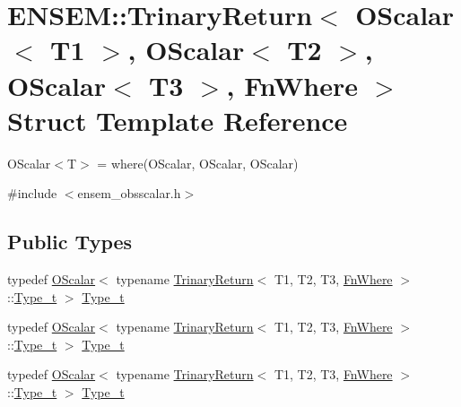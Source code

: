 \hypertarget{structENSEM_1_1TrinaryReturn_3_01OScalar_3_01T1_01_4_00_01OScalar_3_01T2_01_4_00_01OScalar_3_01T3_01_4_00_01FnWhere_01_4}{}\section{E\+N\+S\+EM\+:\+:Trinary\+Return$<$ O\+Scalar$<$ T1 $>$, O\+Scalar$<$ T2 $>$, O\+Scalar$<$ T3 $>$, Fn\+Where $>$ Struct Template Reference}
\label{structENSEM_1_1TrinaryReturn_3_01OScalar_3_01T1_01_4_00_01OScalar_3_01T2_01_4_00_01OScalar_3_01T3_01_4_00_01FnWhere_01_4}


O\+Scalar$<$\+T$>$ = where(\+O\+Scalar, O\+Scalar, O\+Scalar)  




{\ttfamily \#include $<$ensem\+\_\+obsscalar.\+h$>$}

\subsection*{Public Types}
\begin{DoxyCompactItemize}
\item 
typedef \mbox{\hyperlink{classENSEM_1_1OScalar}{O\+Scalar}}$<$ typename \mbox{\hyperlink{structENSEM_1_1TrinaryReturn}{Trinary\+Return}}$<$ T1, T2, T3, \mbox{\hyperlink{structENSEM_1_1FnWhere}{Fn\+Where}} $>$\+::\mbox{\hyperlink{structENSEM_1_1TrinaryReturn_3_01OScalar_3_01T1_01_4_00_01OScalar_3_01T2_01_4_00_01OScalar_3_01T3_01_4_00_01FnWhere_01_4_a6b5cfd8880a0a52baef8bb62d3af1244}{Type\+\_\+t}} $>$ \mbox{\hyperlink{structENSEM_1_1TrinaryReturn_3_01OScalar_3_01T1_01_4_00_01OScalar_3_01T2_01_4_00_01OScalar_3_01T3_01_4_00_01FnWhere_01_4_a6b5cfd8880a0a52baef8bb62d3af1244}{Type\+\_\+t}}
\item 
typedef \mbox{\hyperlink{classENSEM_1_1OScalar}{O\+Scalar}}$<$ typename \mbox{\hyperlink{structENSEM_1_1TrinaryReturn}{Trinary\+Return}}$<$ T1, T2, T3, \mbox{\hyperlink{structENSEM_1_1FnWhere}{Fn\+Where}} $>$\+::\mbox{\hyperlink{structENSEM_1_1TrinaryReturn_3_01OScalar_3_01T1_01_4_00_01OScalar_3_01T2_01_4_00_01OScalar_3_01T3_01_4_00_01FnWhere_01_4_a6b5cfd8880a0a52baef8bb62d3af1244}{Type\+\_\+t}} $>$ \mbox{\hyperlink{structENSEM_1_1TrinaryReturn_3_01OScalar_3_01T1_01_4_00_01OScalar_3_01T2_01_4_00_01OScalar_3_01T3_01_4_00_01FnWhere_01_4_a6b5cfd8880a0a52baef8bb62d3af1244}{Type\+\_\+t}}
\item 
typedef \mbox{\hyperlink{classENSEM_1_1OScalar}{O\+Scalar}}$<$ typename \mbox{\hyperlink{structENSEM_1_1TrinaryReturn}{Trinary\+Return}}$<$ T1, T2, T3, \mbox{\hyperlink{structENSEM_1_1FnWhere}{Fn\+Where}} $>$\+::\mbox{\hyperlink{structENSEM_1_1TrinaryReturn_3_01OScalar_3_01T1_01_4_00_01OScalar_3_01T2_01_4_00_01OScalar_3_01T3_01_4_00_01FnWhere_01_4_a6b5cfd8880a0a52baef8bb62d3af1244}{Type\+\_\+t}} $>$ \mbox{\hyperlink{structENSEM_1_1TrinaryReturn_3_01OScalar_3_01T1_01_4_00_01OScalar_3_01T2_01_4_00_01OScalar_3_01T3_01_4_00_01FnWhere_01_4_a6b5cfd8880a0a52baef8bb62d3af1244}{Type\+\_\+t}}
\end{DoxyCompactItemize}


